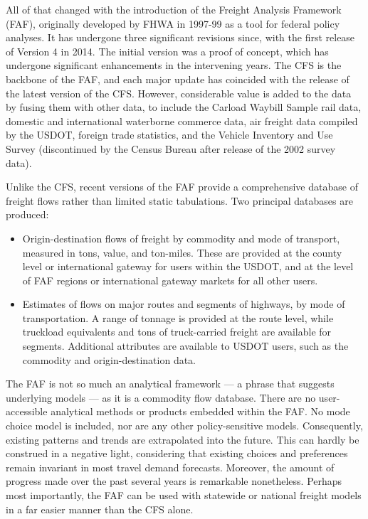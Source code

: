 All of that changed with the introduction of the Freight Analysis Framework (FAF), originally developed by FHWA in 1997-99 as a tool for federal policy analyses. It has undergone three significant revisions since, with the first release of Version 4 in 2014. The initial version was a proof of concept, which has undergone significant enhancements in the intervening years. The CFS is the backbone of the FAF, and each major update has coincided with the release of the latest version of the CFS. However, considerable value is added to the data by fusing them with other data, to include the Carload Waybill Sample rail data, domestic and international waterborne commerce data, air freight data compiled by the USDOT, foreign trade statistics, and the Vehicle Inventory and Use Survey (discontinued by the Census Bureau after release of the 2002 survey data).

Unlike the CFS, recent versions of the FAF provide a comprehensive database of freight flows rather than limited static tabulations. Two principal databases are produced:
\begin{itemize}
\item
Origin-destination flows of freight by commodity and mode of transport, measured in tons, value, and ton-miles. These are provided at the county level or international gateway for users within the USDOT, and at the level of FAF regions or international gateway markets for all other users.
\item
Estimates of flows on major routes and segments of highways, by mode of transportation. A range of tonnage is provided at the route level, while truckload equivalents and tons of truck-carried freight are available for segments. Additional attributes are available to USDOT users, such as the commodity and origin-destination data.
\end{itemize}

The FAF is not so much an analytical framework --- a phrase that suggests underlying models --- as it is a commodity flow database. There are no user-accessible analytical methods or products embedded within the FAF. No mode choice model is included, nor are any other policy-sensitive models. Consequently, existing patterns and trends are extrapolated into the future. This can hardly be construed in a negative light, considering that existing choices and preferences remain invariant in most travel demand forecasts. Moreover, the amount of progress made over the past several years is remarkable nonetheless. Perhaps most importantly, the FAF can be used with statewide or national freight models in a far easier manner than the CFS alone.


